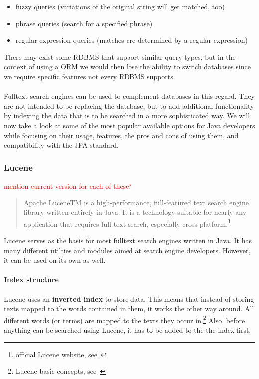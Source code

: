 \begin{itemize}
	\item fuzzy queries (variations of the original string will get matched, too)
	\item phrase queries (search for a specified phrase)
	\item regular expression queries (matches are determined by a regular expression)
\end{itemize}
There may exist some RDBMS that support similar query-types, but in the context of using a ORM we would then lose the ability to switch databases since we require specific features not every RDBMS supports.
\\\\
Fulltext search engines can be used to complement databases in this regard. They are not intended to be replacing the database, but to add additional functionality by indexing the data that is to be searched in a more sophisticated way. We will now take a look at some of the most popular available options for Java developers while focusing on their usage, features, the pros and cons of using them, and compatibility with the JPA standard.

\subsubsection{Lucene}

\textcolor{red}{mention current version for each of these?}

\begin{quote}
	Apache LuceneTM is a high-performance, full-featured text search engine library written entirely in Java. It is a technology suitable for nearly any application that requires full-text search, especially cross-platform.\footnote{official Lucene website, see~\cite{lucene_apache_org}}
\end{quote}
Lucene serves as the basis for most fulltext search engines written in Java. It has many different utilties and modules aimed at search engine developers. However, it can be used on its own as well.

\paragraph{Index structure}
Lucene uses an \textbf{inverted index} to store data. This means that instead of storing texts mapped to the words contained in them, it works the other way around. All different words (or terms) are mapped to the texts they occur in.\footnote{Lucene basic concepts, see~\cite{lucene_basic_concepts}} Also, before anything can be searched using Lucene, it has to be added to the the index first.

